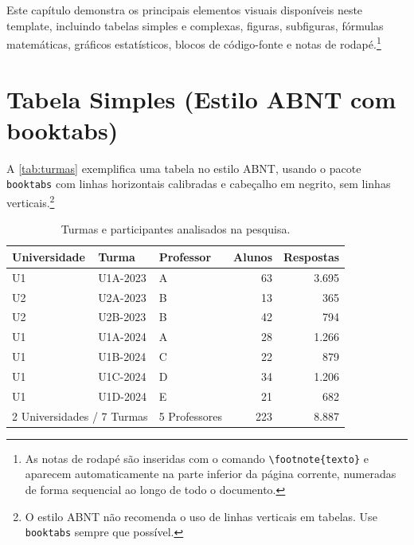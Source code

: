 
Este capítulo demonstra os principais elementos visuais disponíveis
neste template, incluindo tabelas simples e complexas, figuras,
subfiguras, fórmulas matemáticas, gráficos estatísticos, blocos de
código-fonte e notas de rodapé.\footnote{As notas de rodapé são
inseridas com o comando \texttt{\textbackslash footnote\{texto\}} e
aparecem automaticamente na parte inferior da página corrente, numeradas
de forma sequencial ao longo de todo o documento.}

\section{Tabela Simples (Estilo ABNT com booktabs)}

A \autoref{tab:turmas} exemplifica uma tabela no estilo ABNT,
usando o pacote \texttt{booktabs} com linhas horizontais calibradas
e cabeçalho em negrito, sem linhas verticais.\footnote{O estilo ABNT
não recomenda o uso de linhas verticais em tabelas. Use \texttt{booktabs}
sempre que possível.}

\begin{table}[htb]
  \centering
  \caption{Turmas e participantes analisados na pesquisa.}
  \label{tab:turmas}
  \begin{tabularx}{\textwidth}{lllrr}
    \toprule
    \textbf{Universidade} & \textbf{Turma} & \textbf{Professor}
      & \textbf{Alunos} & \textbf{Respostas} \\
    \midrule
    U1 & U1A-2023 & A & 63  & 3.695 \\
    \thinrule
    U2 & U2A-2023 & B & 13  &   365 \\
    \thinrule
    U2 & U2B-2023 & B & 42  &   794 \\
    \midrule
    U1 & U1A-2024 & A & 28  & 1.266 \\
    \thinrule
    U1 & U1B-2024 & C & 22  &   879 \\
    \thinrule
    U1 & U1C-2024 & D & 34  & 1.206 \\
    \thinrule
    U1 & U1D-2024 & E & 21  &   682 \\
    \midrule
    \multicolumn{2}{l}{2 Universidades / 7 Turmas}
      & 5 Professores & 223 & 8.887 \\
    \bottomrule
  \end{tabularx}
\end{table}

